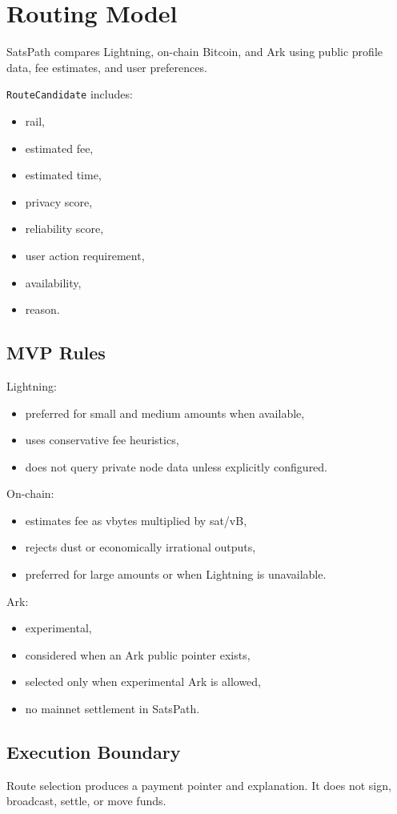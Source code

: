 \documentclass[
]{article}
\author{}
\date{}
\providecommand{\tightlist}{%
  \setlength{\itemsep}{0pt}\setlength{\parskip}{0pt}}
\begin{document}
\hypertarget{routing-model}{%
\section{Routing Model}\label{routing-model}}

SatsPath compares Lightning, on-chain Bitcoin, and Ark using public
profile data, fee estimates, and user preferences.

\texttt{RouteCandidate} includes:

\begin{itemize}
\tightlist
\item
  rail,
\item
  estimated fee,
\item
  estimated time,
\item
  privacy score,
\item
  reliability score,
\item
  user action requirement,
\item
  availability,
\item
  reason.
\end{itemize}

\hypertarget{mvp-rules}{%
\subsection{MVP Rules}\label{mvp-rules}}

Lightning:

\begin{itemize}
\tightlist
\item
  preferred for small and medium amounts when available,
\item
  uses conservative fee heuristics,
\item
  does not query private node data unless explicitly configured.
\end{itemize}

On-chain:

\begin{itemize}
\tightlist
\item
  estimates fee as vbytes multiplied by sat/vB,
\item
  rejects dust or economically irrational outputs,
\item
  preferred for large amounts or when Lightning is unavailable.
\end{itemize}

Ark:

\begin{itemize}
\tightlist
\item
  experimental,
\item
  considered when an Ark public pointer exists,
\item
  selected only when experimental Ark is allowed,
\item
  no mainnet settlement in SatsPath.
\end{itemize}

\hypertarget{execution-boundary}{%
\subsection{Execution Boundary}\label{execution-boundary}}

Route selection produces a payment pointer and explanation. It does not
sign, broadcast, settle, or move funds.
\end{document}
